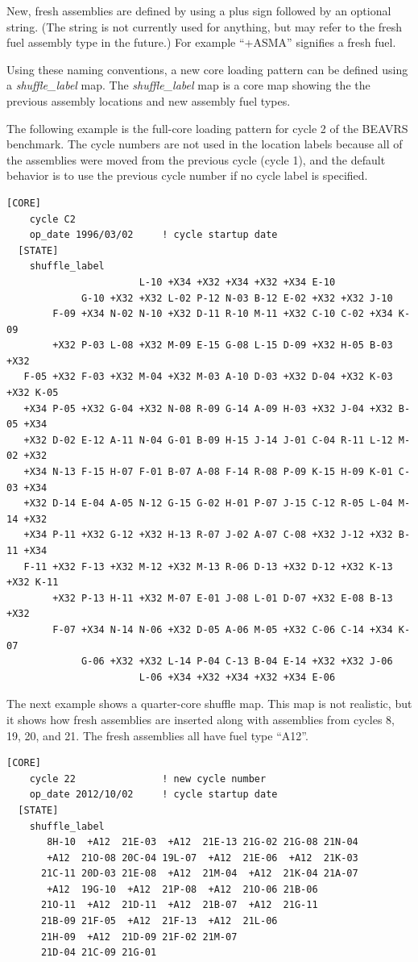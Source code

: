 New, fresh assemblies are defined by using a plus sign followed by an optional string.
(The string is not currently used for anything, but may refer to the fresh fuel assembly type in the future.)
For example ``+ASMA'' signifies a fresh fuel.

Using these naming conventions, a new core loading pattern can be defined using a {\it shuffle\_label} map.
The {\it shuffle\_label} map is a core map showing the the previous assembly locations and
new assembly fuel types.

The following example is the full-core loading pattern for cycle 2 of the BEAVRS benchmark.
The cycle numbers are not used in the location labels because all of the assemblies
were moved from the previous cycle (cycle 1), and the default behavior is to use
the previous cycle number if no cycle label is specified.
\begin{Verbatim}[fontsize=\small]
  [CORE]
    cycle C2
    op_date 1996/03/02     ! cycle startup date
  [STATE]
    shuffle_label
                       L-10 +X34 +X32 +X34 +X32 +X34 E-10
             G-10 +X32 +X32 L-02 P-12 N-03 B-12 E-02 +X32 +X32 J-10
        F-09 +X34 N-02 N-10 +X32 D-11 R-10 M-11 +X32 C-10 C-02 +X34 K-09
        +X32 P-03 L-08 +X32 M-09 E-15 G-08 L-15 D-09 +X32 H-05 B-03 +X32
   F-05 +X32 F-03 +X32 M-04 +X32 M-03 A-10 D-03 +X32 D-04 +X32 K-03 +X32 K-05
   +X34 P-05 +X32 G-04 +X32 N-08 R-09 G-14 A-09 H-03 +X32 J-04 +X32 B-05 +X34
   +X32 D-02 E-12 A-11 N-04 G-01 B-09 H-15 J-14 J-01 C-04 R-11 L-12 M-02 +X32
   +X34 N-13 F-15 H-07 F-01 B-07 A-08 F-14 R-08 P-09 K-15 H-09 K-01 C-03 +X34
   +X32 D-14 E-04 A-05 N-12 G-15 G-02 H-01 P-07 J-15 C-12 R-05 L-04 M-14 +X32
   +X34 P-11 +X32 G-12 +X32 H-13 R-07 J-02 A-07 C-08 +X32 J-12 +X32 B-11 +X34
   F-11 +X32 F-13 +X32 M-12 +X32 M-13 R-06 D-13 +X32 D-12 +X32 K-13 +X32 K-11
        +X32 P-13 H-11 +X32 M-07 E-01 J-08 L-01 D-07 +X32 E-08 B-13 +X32
        F-07 +X34 N-14 N-06 +X32 D-05 A-06 M-05 +X32 C-06 C-14 +X34 K-07
             G-06 +X32 +X32 L-14 P-04 C-13 B-04 E-14 +X32 +X32 J-06
                       L-06 +X34 +X32 +X34 +X32 +X34 E-06
\end{Verbatim}

The next example shows a quarter-core shuffle map.  This map is not realistic,
but it shows how fresh assemblies are inserted along with assemblies from
cycles 8, 19, 20, and 21.  The fresh assemblies all have fuel type ``A12''.
\begin{Verbatim}[fontsize=\small]
  [CORE]
    cycle 22               ! new cycle number
    op_date 2012/10/02     ! cycle startup date
  [STATE]
    shuffle_label
       8H-10  +A12  21E-03  +A12  21E-13 21G-02 21G-08 21N-04
       +A12  21O-08 20C-04 19L-07  +A12  21E-06  +A12  21K-03
      21C-11 20D-03 21E-08  +A12  21M-04  +A12  21K-04 21A-07
       +A12  19G-10  +A12  21P-08  +A12  21O-06 21B-06
      21O-11  +A12  21D-11  +A12  21B-07  +A12  21G-11
      21B-09 21F-05  +A12  21F-13  +A12  21L-06
      21H-09  +A12  21D-09 21F-02 21M-07
      21D-04 21C-09 21G-01
\end{Verbatim}

